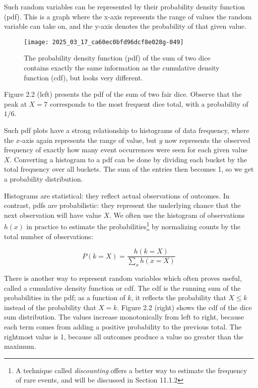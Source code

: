 \documentclass[10pt]{article}
\begin{document}
Such random variables can be represented by their probability density function (pdf). This is a graph where the x-axis represents the range of values the random variable can take on, and the y-axis denotes the probability of that given value. 

\begin{figure}[h]
    \centering
   \caption{The probability density function (pdf) of the sum of two dice contains exactly the same information as the cumulative density function (cdf), but looks very different.}
    \texttt{[image: 2025\_03\_17\_ca60ec0bfd96dcf8e028g-049]}
\end{figure}

Figure 2.2 (left) presents the pdf of the sum of two fair dice. Observe that the peak at \(X=7\) corresponds to the most frequent dice total, with a probability of \(1/6\).

Such pdf plots have a strong relationship to histograms of data frequency, where the \(x\)-axis again represents the range of value, but \(y\) now represents the observed frequency of exactly how many event occurrences were seen for each given value \(X\). Converting a histogram to a pdf can be done by dividing each bucket by the total frequency over all buckets. The sum of the entries then becomes 1, so we get a probability distribution.

Histograms are statistical: they reflect actual observations of outcomes. In contrast, pdfs are probabilistic: they represent the underlying chance that the next observation will have value \(X\). We often use the histogram of observations \(h(x)\) in practice to estimate the probabilities\footnote{A technique called \textit{discounting} offers a better way to estimate the frequency of rare events, and will be discussed in Section 11.1.2} by normalizing counts by the total number of observations:

\[ P(k=X)=\frac{h(k=X)}{\sum_{x} h(x=X)} \]

There is another way to represent random variables which often proves useful, called a cumulative density function or cdf. The cdf is the running sum of the probabilities in the pdf; as a function of \(k\), it reflects the probability that \(X \leq k\) instead of the probability that \(X=k\). Figure 2.2 (right) shows the cdf of the dice sum distribution. The values increase monotonically from left to right, because each term comes from adding a positive probability to the previous total. The rightmost value is 1, because all outcomes produce a value no greater than the maximum.
\end{document}
